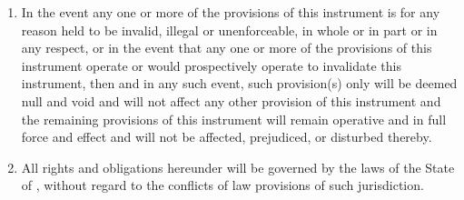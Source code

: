 \begin{enumerate}[label=(\alph*)]
\item {In the event any one or more of the provisions of this
    instrument is for any reason held to be invalid, illegal or
    unenforceable, in whole or in part or in any respect, or in the
    event that any one or more of the provisions of this instrument
    operate or would prospectively operate to invalidate this
    instrument, then and in any such event, such provision(s) only
    will be deemed null and void and will not affect any other
    provision of this instrument and the remaining provisions of this
    instrument will remain operative and in full force and effect and
    will not be affected, prejudiced, or disturbed thereby.}

\item {All rights and obligations hereunder will be governed by the
    laws of the State of \CompanyState{}, without regard to the conflicts
    of law provisions of such jurisdiction.}

\end{enumerate}
